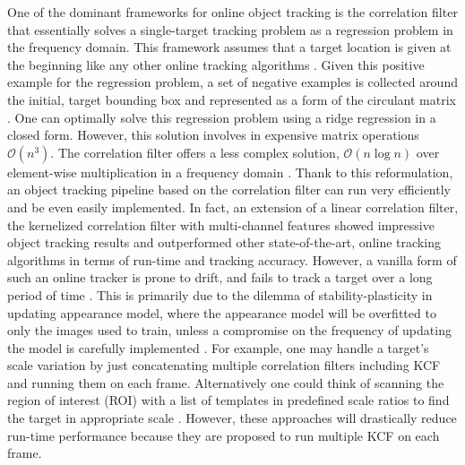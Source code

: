 \documentclass[10pt,twocolumn,letterpaper]{article}
\begin{document}
One of the dominant frameworks for online object tracking is the
correlation filter that essentially solves a single-target tracking
problem as a regression problem in the frequency domain. This
framework assumes that a target location is given at the beginning
like any other online tracking algorithms
\cite{smeulders2014survey}. Given this positive example for the
regression problem, a set of negative examples is collected around the
initial, target bounding box and represented as a form of the
circulant matrix \cite{henriques2015high}. One can optimally solve
this regression problem using a ridge regression in a closed
form. However, this solution involves in expensive matrix operations
$\mathcal{O}(n^{3})$. The correlation filter offers a less complex
solution, $\mathcal{O}(n\log n)$ over element-wise multiplication in a
frequency domain \cite{bolme2010visual,henriques2015high}. Thank to
this reformulation, an object tracking pipeline based on the
correlation filter can run very efficiently and be even easily
implemented. In fact, an extension of a linear correlation filter, the
kernelized correlation filter with multi-channel features
\cite{henriques2015high} showed impressive object tracking results and
outperformed other state-of-the-art, online tracking algorithms in
terms of run-time and tracking accuracy. However, a vanilla form of
such an online tracker is prone to drift, and fails to track a target
over a long period of time \cite{henriques2015high}. This is primarily
due to the dilemma of stability-plasticity in updating appearance
model, where the appearance model will be overfitted to only the
images used to train, unless a compromise on the frequency of updating
the model is carefully implemented \cite{santner2010prost}. For
example, one may handle a target's scale variation by just
concatenating multiple correlation filters including KCF and running
them on each frame. Alternatively one could think of scanning the
region of interest (ROI) with a list of templates in predefined scale
ratios to find the target in appropriate scale
\cite{henriques2015high,tang2015multi,ma2015long,bibi2015multi,li2014scale}. However,
these approaches will drastically reduce run-time performance because
they are proposed to run multiple KCF on each frame.
\end{document}
